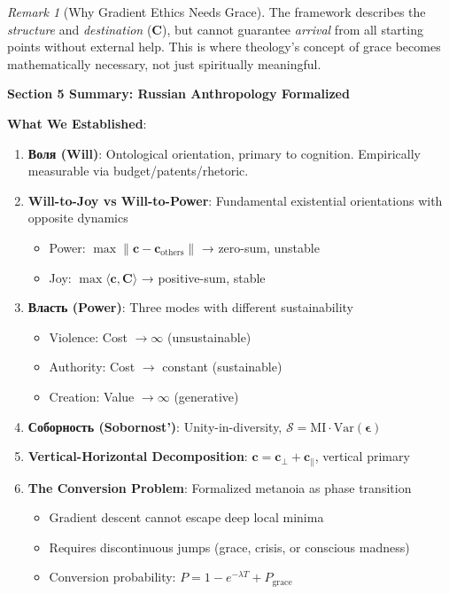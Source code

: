 \documentclass[11pt,a4paper]{article}
\theoremstyle{definition}
\theoremstyle{remark}
\newtheorem{remark}{Remark}[section]
\newcommand{\cc}{\mathbf{c}}
\begin{document}
\begin{enumerate}
\begin{remark}[Why Gradient Ethics Needs Grace]
The framework describes the \textit{structure} and \textit{destination} (\(\mathbf{C}\)), but cannot guarantee \textit{arrival} from all starting points without external help. This is where theology's concept of grace becomes mathematically necessary, not just spiritually meaningful.
\end{remark}

\begin{mdframed}[backgroundcolor=green!10,linewidth=2pt,linecolor=green!70!black]
\textbf{Section 5 Summary: Russian Anthropology Formalized}

\textbf{What We Established}:
\begin{enumerate}[nosep]
    \item \textbf{Воля (Will)}: Ontological orientation, primary to cognition. Empirically measurable via budget/patents/rhetoric.
    \item \textbf{Will-to-Joy vs Will-to-Power}: Fundamental existential orientations with opposite dynamics
        \begin{itemize}[nosep]
            \item Power: \(\max \|\cc - \cc_{\text{others}}\|\) → zero-sum, unstable
            \item Joy: \(\max \langle \cc, \mathbf{C} \rangle\) → positive-sum, stable
        \end{itemize}
    \item \textbf{Власть (Power)}: Three modes with different sustainability
        \begin{itemize}[nosep]
            \item Violence: Cost \(\to \infty\) (unsustainable)
            \item Authority: Cost \(\to\) constant (sustainable)
            \item Creation: Value \(\to \infty\) (generative)
        \end{itemize}
    \item \textbf{Соборность (Sobornost')}: Unity-in-diversity, \(\mathcal{S} = \text{MI} \cdot \text{Var}(\boldsymbol{\epsilon})\)
    \item \textbf{Vertical-Horizontal Decomposition}: \(\cc = \cc_{\perp} + \cc_{\parallel}\), vertical primary
    \item \textbf{The Conversion Problem}: Formalized metanoia as phase transition
        \begin{itemize}[nosep]
            \item Gradient descent cannot escape deep local minima
            \item Requires discontinuous jumps (grace, crisis, or conscious madness)
            \item Conversion probability: \(P = 1 - e^{-\lambda T} + P_{\text{grace}}\)
        \end{itemize}
\end{enumerate}


\end{mdframed}
\end{enumerate}
\end{document}
